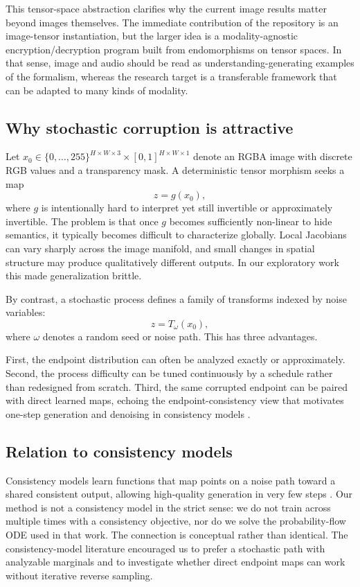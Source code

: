 \documentclass[11pt]{article}
\begin{document}
This tensor-space abstraction clarifies why the current image results matter beyond images themselves. The immediate contribution of the repository is an image-tensor instantiation, but the larger idea is a modality-agnostic encryption/decryption program built from endomorphisms on tensor spaces. In that sense, image and audio should be read as understanding-generating examples of the formalism, whereas the research target is a transferable framework that can be adapted to many kinds of modality.

\subsection{Why stochastic corruption is attractive}
Let $x_0 \in \{0,\dots,255\}^{H \times W \times 3} \times [0,1]^{H \times W \times 1}$ denote an RGBA image with discrete RGB values and a transparency mask. A deterministic tensor morphism seeks a map
\begin{equation}
z = g(x_0),
\end{equation}
where $g$ is intentionally hard to interpret yet still invertible or approximately invertible. The problem is that once $g$ becomes sufficiently non-linear to hide semantics, it typically becomes difficult to characterize globally. Local Jacobians can vary sharply across the image manifold, and small changes in spatial structure may produce qualitatively different outputs. In our exploratory work this made generalization brittle.

By contrast, a stochastic process defines a family of transforms indexed by noise variables:
\begin{equation}
z = T_{\omega}(x_0),
\end{equation}
where $\omega$ denotes a random seed or noise path. This has three advantages.

First, the endpoint distribution can often be analyzed exactly or approximately. Second, the process difficulty can be tuned continuously by a schedule rather than redesigned from scratch. Third, the same corrupted endpoint can be paired with direct learned maps, echoing the endpoint-consistency view that motivates one-step generation and denoising in consistency models \citep{song2023consistency}.

\subsection{Relation to consistency models}
Consistency models learn functions that map points on a noise path toward a shared consistent output, allowing high-quality generation in very few steps \citep{song2023consistency}. Our method is not a consistency model in the strict sense: we do not train across multiple times with a consistency objective, nor do we solve the probability-flow ODE used in that work. The connection is conceptual rather than identical. The consistency-model literature encouraged us to prefer a stochastic path with analyzable marginals and to investigate whether direct endpoint maps can work without iterative reverse sampling.
\end{document}
